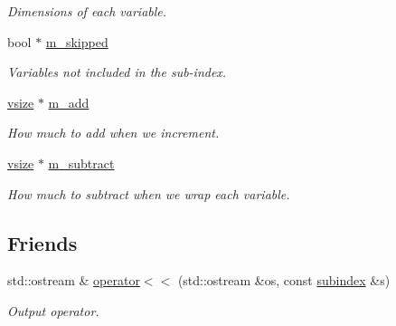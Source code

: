 \begin{DoxyCompactItemize}
\begin{DoxyCompactList}\small\item\em Dimensions of each variable. \end{DoxyCompactList}\item 
bool $\ast$ \hyperlink{classmerlin_1_1subindex_a5b9ae8404bdc32036922ee2c220da5dc}{m\+\_\+skipped}\hypertarget{classmerlin_1_1subindex_a5b9ae8404bdc32036922ee2c220da5dc}{}\label{classmerlin_1_1subindex_a5b9ae8404bdc32036922ee2c220da5dc}

\begin{DoxyCompactList}\small\item\em Variables not included in the sub-\/index. \end{DoxyCompactList}\item 
\hyperlink{classmerlin_1_1subindex_a85a7fddb94bd83a77a4a73293c5d613a}{vsize} $\ast$ \hyperlink{classmerlin_1_1subindex_a1dde0ca8f1664ef945f74070711f6816}{m\+\_\+add}\hypertarget{classmerlin_1_1subindex_a1dde0ca8f1664ef945f74070711f6816}{}\label{classmerlin_1_1subindex_a1dde0ca8f1664ef945f74070711f6816}

\begin{DoxyCompactList}\small\item\em How much to add when we increment. \end{DoxyCompactList}\item 
\hyperlink{classmerlin_1_1subindex_a85a7fddb94bd83a77a4a73293c5d613a}{vsize} $\ast$ \hyperlink{classmerlin_1_1subindex_a4366c38983a38191319f53bbee8461ad}{m\+\_\+subtract}\hypertarget{classmerlin_1_1subindex_a4366c38983a38191319f53bbee8461ad}{}\label{classmerlin_1_1subindex_a4366c38983a38191319f53bbee8461ad}

\begin{DoxyCompactList}\small\item\em How much to subtract when we wrap each variable. \end{DoxyCompactList}\end{DoxyCompactItemize}
\subsection*{Friends}
\begin{DoxyCompactItemize}
\item 
std\+::ostream \& \hyperlink{classmerlin_1_1subindex_ae3af7027432ef1db960d32c52007877d}{operator$<$$<$} (std\+::ostream \&os, const \hyperlink{classmerlin_1_1subindex}{subindex} \&s)\hypertarget{classmerlin_1_1subindex_ae3af7027432ef1db960d32c52007877d}{}\label{classmerlin_1_1subindex_ae3af7027432ef1db960d32c52007877d}

\begin{DoxyCompactList}\small\item\em Output operator. \end{DoxyCompactList}\end{DoxyCompactItemize}



